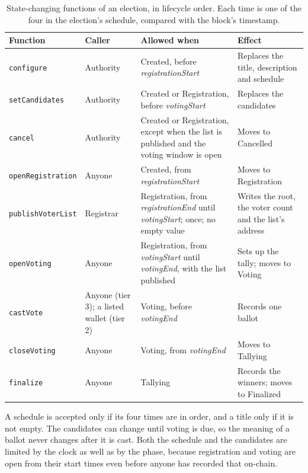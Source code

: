 \begin{table}[htbp]
  \centering
  \caption{State-changing functions of an election, in lifecycle order. Each
    time is one of the four in the election's schedule, compared with the
    block's timestamp.}
  \label{tab:entrypoints}
  \small
  \begin{tabular}{@{}L{3.0cm}L{2.3cm}L{6.4cm}L{5.4cm}@{}}
    \toprule
    \textbf{Function} & \textbf{Caller} & \textbf{Allowed when} & \textbf{Effect} \\
    \midrule
    \texttt{configure} & Authority & Created, before \mbox{\emph{registrationStart}} & Replaces the title, description and schedule \\
    \addlinespace[2pt]
    \texttt{setCandidates} & Authority & Created or Registration, before \mbox{\emph{votingStart}} & Replaces the candidates \\
    \addlinespace[2pt]
    \texttt{cancel} & Authority & Created or Registration, except when the list is published and the voting window is open & Moves to Cancelled \\
    \addlinespace[2pt]
    \texttt{openRegistration} & Anyone & Created, from \mbox{\emph{registrationStart}} & Moves to Registration \\
    \addlinespace[2pt]
    \texttt{publishVoterList} & Registrar & Registration, from \mbox{\emph{registrationEnd}} until \mbox{\emph{votingStart}}; once; no empty value & Writes the root, the voter count and the list's address \\
    \addlinespace[2pt]
    \texttt{openVoting} & Anyone & Registration, from \mbox{\emph{votingStart}} until \mbox{\emph{votingEnd}}, with the list published & Sets up the tally; moves to Voting \\
    \addlinespace[2pt]
    \texttt{castVote} & Anyone (tier 3); a listed wallet (tier 2) & Voting, before \mbox{\emph{votingEnd}} & Records one ballot \\
    \addlinespace[2pt]
    \texttt{closeVoting} & Anyone & Voting, from \mbox{\emph{votingEnd}} & Moves to Tallying \\
    \addlinespace[2pt]
    \texttt{finalize} & Anyone & Tallying & Records the winners; moves to Finalized \\
    \bottomrule
  \end{tabular}
\end{table}

A schedule is accepted only if its four times are in order, and a title only
if it is not empty. The candidates can change until voting is due, so the
meaning of a ballot never changes after it is cast. Both the schedule and the
candidates are limited by the clock as well as by the phase, because
registration and voting are open from their start times even before anyone
has recorded that on-chain.

